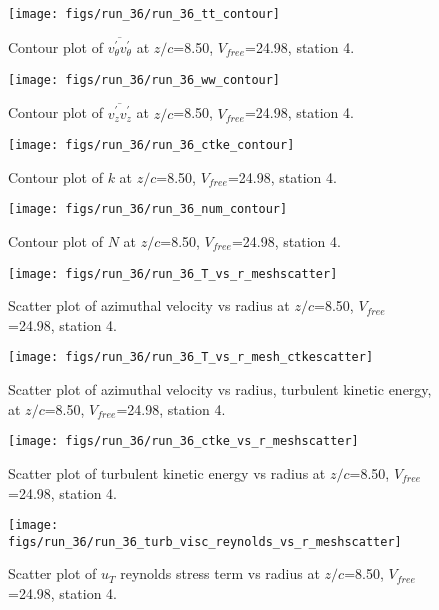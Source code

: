 \begin{figure}[H]
\centering
\texttt{[image: figs/run\_36/run\_36\_tt\_contour]}
\caption{Contour plot of $\overline{v_{\theta}^{\prime} v_{\theta}^{\prime}}$ at $z/c$=8.50, $V_{free}$=24.98, station 4.}
\end{figure}


\begin{figure}[H]
\centering
\texttt{[image: figs/run\_36/run\_36\_ww\_contour]}
\caption{Contour plot of $\overline{v_{z}^{\prime} v_{z}^{\prime}}$ at $z/c$=8.50, $V_{free}$=24.98, station 4.}
\end{figure}


\begin{figure}[H]
\centering
\texttt{[image: figs/run\_36/run\_36\_ctke\_contour]}
\caption{Contour plot of $k$ at $z/c$=8.50, $V_{free}$=24.98, station 4.}
\end{figure}


\begin{figure}[H]
\centering
\texttt{[image: figs/run\_36/run\_36\_num\_contour]}
\caption{Contour plot of $N$ at $z/c$=8.50, $V_{free}$=24.98, station 4.}
\end{figure}


\begin{figure}[H]
\centering
\texttt{[image: figs/run\_36/run\_36\_T\_vs\_r\_meshscatter]}
\caption{Scatter plot of azimuthal velocity vs radius at $z/c$=8.50, $V_{free}$=24.98, station 4.}
\end{figure}


\begin{figure}[H]
\centering
\texttt{[image: figs/run\_36/run\_36\_T\_vs\_r\_mesh\_ctkescatter]}
\caption{Scatter plot of azimuthal velocity vs radius, turbulent kinetic energy, at $z/c$=8.50, $V_{free}$=24.98, station 4.}
\end{figure}


\begin{figure}[H]
\centering
\texttt{[image: figs/run\_36/run\_36\_ctke\_vs\_r\_meshscatter]}
\caption{Scatter plot of turbulent kinetic energy vs radius at $z/c$=8.50, $V_{free}$=24.98, station 4.}
\end{figure}


\begin{figure}[H]
\centering
\texttt{[image: figs/run\_36/run\_36\_turb\_visc\_reynolds\_vs\_r\_meshscatter]}
\caption{Scatter plot of $
u_T$ reynolds stress term vs radius at $z/c$=8.50, $V_{free}$=24.98, station 4.}
\end{figure}


